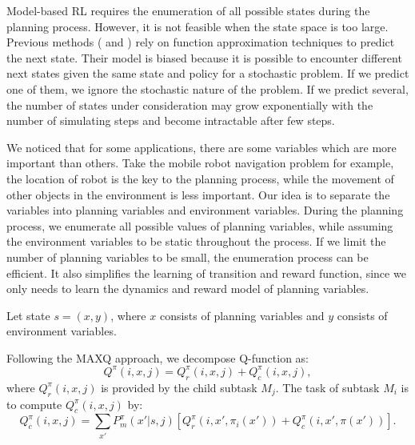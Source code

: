 \documentclass{article} %
\begin{document}
Model-based RL requires the enumeration of all possible states during the planning process.
However, it is not feasible when the state space is too large.
Previous methods (\cite{ApproxDyna} and \cite{ApproxTree}) rely on function approximation
techniques to predict the next state. Their model is biased because it is possible 
to encounter different next states given the same state and policy for a stochastic problem. If we 
predict one of them, we ignore the stochastic nature of the problem. If we predict
several, the number of states under consideration may grow exponentially with the number of simulating steps
and become intractable after few steps.

We noticed that for some applications, there are some variables which are more important
than others. Take the mobile robot navigation problem for example, the location of robot 
is the key to the planning process, while the movement of other objects in the environment is less important.
Our idea is to separate the variables into planning variables 
and environment variables. During the planning process, we enumerate all possible values of planning variables, while assuming 
the environment variables to be static throughout the process. 
If we limit the number of planning variables to be small, the enumeration process can be efficient.
It also simplifies the learning of transition and reward function, since we only needs to learn
the dynamics and reward model of planning variables.

Let state $s = (x, y)$, where $x$ consists of planning variables and $y$ consists of environment
variables. 


Following the MAXQ approach, we decompose Q-function as:
\begin{equation}
    Q^{\pi}(i, x, j) = Q_r^{\pi}(i, x, j) + Q_c^{\pi}(i, x, j),
    \label{eq:biasedMaxQ}
\end{equation}
where $Q_r^{\pi}(i, x, j)$ is provided by the child subtask $M_j$.
The task of subtask $M_i$ is to compute $Q_c^{\pi}(i, x, j)$ by:
\begin{equation}
    Q_c^{\pi}(i, x, j) = \sum_{x'} P_m^{\pi}(x'|s, j)[Q_r^{\pi}(i, x', \pi_i(x')) + Q_c^{\pi}(i, x', \pi(x'))].
    \label{eq:biasedQc}
\end{equation}
\end{document}
